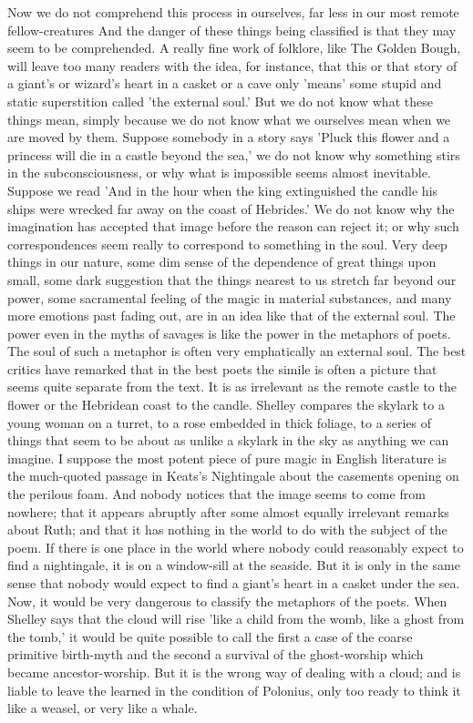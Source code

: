 Now we do not comprehend this process in ourselves, far less in our most remote fellow-creatures And the danger of these things being classified is that they may seem to be comprehended. A really fine work of folklore, like The Golden Bough, will leave too many readers with the idea, for instance, that this or that story of a giant's or wizard's heart in a casket or a cave only 'means' some stupid and static superstition called 'the external soul.' But we do not know what these things mean, simply because we do not know what we ourselves mean when we are moved by them. Suppose somebody in a story says 'Pluck this flower and a princess will die in a castle beyond the sea,' we do not know why something stirs in the subconsciousness, or why what is impossible seems almost inevitable. Suppose we read 'And in the hour when the king extinguished the candle his ships were wrecked far away on the coast of Hebrides.' We do not know why the imagination has accepted that image before the reason can reject it; or why such correspondences seem really to correspond to something in the soul. Very deep things in our nature, some dim sense of the dependence of great things upon small, some dark suggestion that the things nearest to us stretch far beyond our power, some sacramental feeling of the magic in material substances, and many more emotions past fading out, are in an idea like that of the external soul. The power even in the myths of savages is like the power in the metaphors of poets. The soul of such a metaphor is often very emphatically an external soul. The best critics have remarked that in the best poets the simile is often a picture that seems quite separate from the text. It is as irrelevant as the remote castle to the flower or the Hebridean coast to the candle. Shelley compares the skylark to a young woman on a turret, to a rose embedded in thick foliage, to a series of things that seem to be about as unlike a skylark in the sky as anything we can imagine. I suppose the most potent piece of pure magic in English literature is the much-quoted passage in Keats's Nightingale about the casements opening on the perilous foam. And nobody notices that the image seems to come from nowhere; that it appears abruptly after some almost equally irrelevant remarks about Ruth; and that it has nothing in the world to do with the subject of the poem. If there is one place in the world where nobody could reasonably expect to find a nightingale, it is on a window-sill at the seaside. But it is only in the same sense that nobody would expect to find a giant's heart in a casket under the sea. Now, it would be very dangerous to classify the metaphors of the poets. When Shelley says that the cloud will rise 'like a child from the womb, like a ghost from the tomb,' it would be quite possible to call the first a case of the coarse primitive birth-myth and the second a survival of the ghost-worship which became ancestor-worship. But it is the wrong way of dealing with a cloud; and is liable to leave the learned in the condition of Polonius, only too ready to think it like a weasel, or very like a whale.

